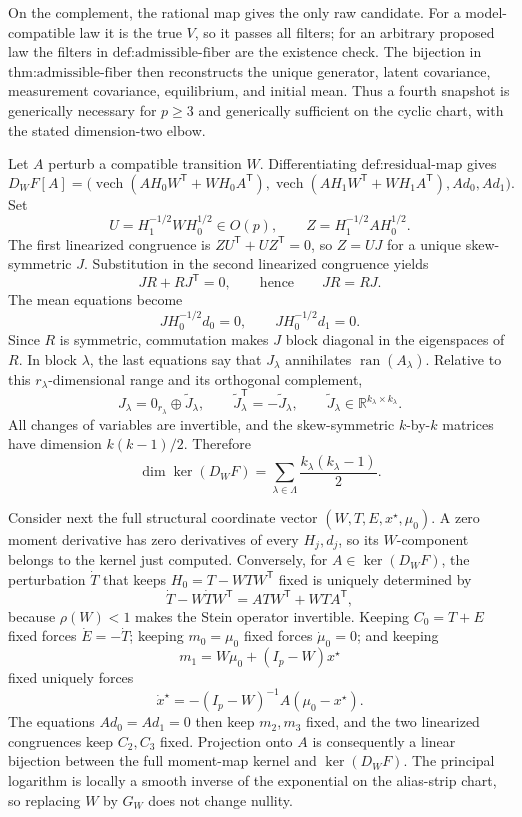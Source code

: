 On the complement, the rational map gives the only raw candidate.  For a model-compatible law it is the true \(V\), so it passes all filters; for an arbitrary proposed law the filters in \(\text{def:admissible-fiber}\) are the existence check.  The bijection in \(\text{thm:admissible-fiber}\) then reconstructs the unique generator, latent covariance, measurement covariance, equilibrium, and initial mean.  Thus a fourth snapshot is generically necessary for \(p\ge3\) and generically sufficient on the cyclic chart, with the stated dimension-two elbow.

Let \(A\) perturb a compatible transition \(W\).  Differentiating \(\text{def:residual-map}\) gives
\[
 D_WF[A]=\bigl(
 \operatorname{vech}(AH_0W^{\mathsf T}+WH_0A^{\mathsf T}),
 \operatorname{vech}(AH_1W^{\mathsf T}+WH_1A^{\mathsf T}),
 Ad_0,Ad_1\bigr).
\]
Set
\[
 U=H_1^{-1/2}WH_0^{1/2}\in O(p),\qquad
 Z=H_1^{-1/2}AH_0^{1/2}.
\]
The first linearized congruence is \(ZU^{\mathsf T}+UZ^{\mathsf T}=0\), so \(Z=UJ\) for a unique skew-symmetric \(J\).  Substitution in the second linearized congruence yields
\[
 JR+RJ^{\mathsf T}=0,\qquad\text{hence}\qquad JR=RJ.
\]
The mean equations become
\[
 JH_0^{-1/2}d_0=0,\qquad JH_0^{-1/2}d_1=0.
\]
Since \(R\) is symmetric, commutation makes \(J\) block diagonal in the eigenspaces of \(R\).  In block \(\lambda\), the last equations say that \(J_\lambda\) annihilates \(\operatorname{ran}(A_\lambda)\).  Relative to this \(r_\lambda\)-dimensional range and its orthogonal complement,
\[
 J_\lambda=0_{r_\lambda}\oplus\widetilde J_\lambda,\qquad
 \widetilde J_\lambda^{\mathsf T}=-\widetilde J_\lambda,\qquad
 \widetilde J_\lambda\in\mathbb R^{k_\lambda\times k_\lambda}.
\]
All changes of variables are invertible, and the skew-symmetric \(k\)-by-\(k\) matrices have dimension \(k(k-1)/2\).  Therefore
\[
 \dim\ker(D_WF)=\sum_{\lambda\in\Lambda}
 \frac{k_\lambda(k_\lambda-1)}2.
\]

Consider next the full structural coordinate vector \((W,T,E,x^\star,\mu_0)\).  A zero moment derivative has zero derivatives of every \(H_j,d_j\), so its \(W\)-component belongs to the kernel just computed.  Conversely, for \(A\in\ker(D_WF)\), the perturbation \(\dot T\) that keeps \(H_0=T-WTW^{\mathsf T}\) fixed is uniquely determined by
\[
 \dot T-W\dot TW^{\mathsf T}=ATW^{\mathsf T}+WTA^{\mathsf T},
\]
because \(\rho(W)<1\) makes the Stein operator invertible.  Keeping \(C_0=T+E\) fixed forces \(\dot E=-\dot T\); keeping \(m_0=\mu_0\) fixed forces \(\dot\mu_0=0\); and keeping
\[
 m_1=W\mu_0+(I_p-W)x^\star
\]
fixed uniquely forces
\[
 \dot x^\star=-(I_p-W)^{-1}A(\mu_0-x^\star).
\]
The equations \(Ad_0=Ad_1=0\) then keep \(m_2,m_3\) fixed, and the two linearized congruences keep \(C_2,C_3\) fixed.  Projection onto \(A\) is consequently a linear bijection between the full moment-map kernel and \(\ker(D_WF)\).  The principal logarithm is locally a smooth inverse of the exponential on the alias-strip chart, so replacing \(W\) by \(G_W\) does not change nullity.


